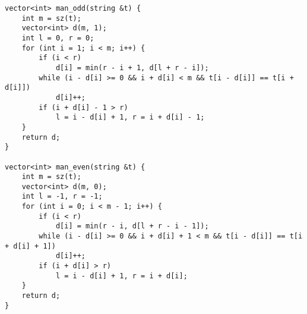 \documentclass{article}
\begin{document}
    \begin{verbatim}
vector<int> man_odd(string &t) {
    int m = sz(t);
    vector<int> d(m, 1);
    int l = 0, r = 0;
    for (int i = 1; i < m; i++) {
        if (i < r)
            d[i] = min(r - i + 1, d[l + r - i]);
        while (i - d[i] >= 0 && i + d[i] < m && t[i - d[i]] == t[i + d[i]])
            d[i]++;
        if (i + d[i] - 1 > r)
            l = i - d[i] + 1, r = i + d[i] - 1;
    }
    return d;
}

vector<int> man_even(string &t) {
    int m = sz(t);
    vector<int> d(m, 0);
    int l = -1, r = -1;
    for (int i = 0; i < m - 1; i++) {
        if (i < r)
            d[i] = min(r - i, d[l + r - i - 1]);
        while (i - d[i] >= 0 && i + d[i] + 1 < m && t[i - d[i]] == t[i + d[i] + 1])
            d[i]++;
        if (i + d[i] > r)
            l = i - d[i] + 1, r = i + d[i];
    }
    return d;
}
    \end{verbatim}   
\end{document}
